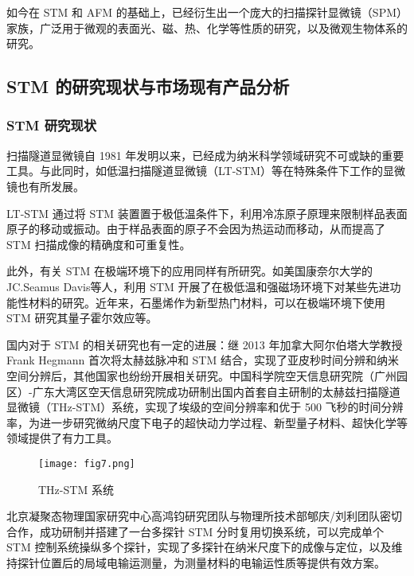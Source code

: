 \documentclass{article}
\begin{document}
\begin{spacing}{1.625}
	如今在 STM 和 AFM 的基础上，已经衍生出一个庞大的扫描探针显微镜（SPM）家族，广泛用于微观的表面光、磁、热、化学等性质的研究，以及微观生物体系的研究。
	
	
	\subsection{STM 的研究现状与市场现有产品分析}
	\subsubsection[STM 研究现状]{STM 研究现状}
	扫描隧道显微镜自 1981 年发明以来，已经成为纳米科学领域研究不可或缺的重要工具。与此同时，如低温扫描隧道显微镜（LT-STM）等在特殊条件下工作的显微镜也有所发展\cite{ref5,ref6,ref7}。
	
	LT-STM 通过将 STM 装置置于极低温条件下，利用冷冻原子原理来限制样品表面原子的移动或振动。由于样品表面的原子不会因为热运动而移动，从而提高了 STM 扫描成像的精确度和可重复性\cite{ref8}。
	
	此外，有关 STM 在极端环境下的应用同样有所研究\cite{ref1,ref2,ref3}。如美国康奈尔大学的 JC.Seamus Davis等人\cite{ref4}，利用 STM 开展了在极低温和强磁场环境下对某些先进功能性材料的研究。近年来，石墨烯作为新型热门材料，可以在极端环境下使用 STM 研究其量子霍尔效应等。
	
	国内对于 STM 的相关研究也有一定的进展：继 2013 年加拿大阿尔伯塔大学教授 Frank Hegmann 首次将太赫兹脉冲和 STM 结合，实现了亚皮秒时间分辨和纳米空间分辨后，其他国家也纷纷开展相关研究。中国科学院空天信息研究院（广州园区）-广东大湾区空天信息研究院成功研制出国内首套自主研制的太赫兹扫描隧道显微镜（THz-STM）系统，实现了埃级的空间分辨率和优于 500 飞秒的时间分辨率，为进一步研究微纳尺度下电子的超快动力学过程、新型量子材料、超快化学等领域提供了有力工具\cite{ref9}。
	
	\begin{figure}[htbp]
		\centering 
		\texttt{[image: fig7.png]}
		\caption{THz-STM 系统}
	\end{figure}
	
	北京凝聚态物理国家研究中心高鸿钧研究团队与物理所技术部郇庆/刘利团队密切合作，成功研制并搭建了一台多探针 STM 分时复用切换系统，可以完成单个 STM 控制系统操纵多个探针，实现了多探针在纳米尺度下的成像与定位，以及维持探针位置后的局域电输运测量\cite{ref10}，为测量材料的电输运性质等提供有效方案。
	
	
	

\end{spacing}
\end{document}
